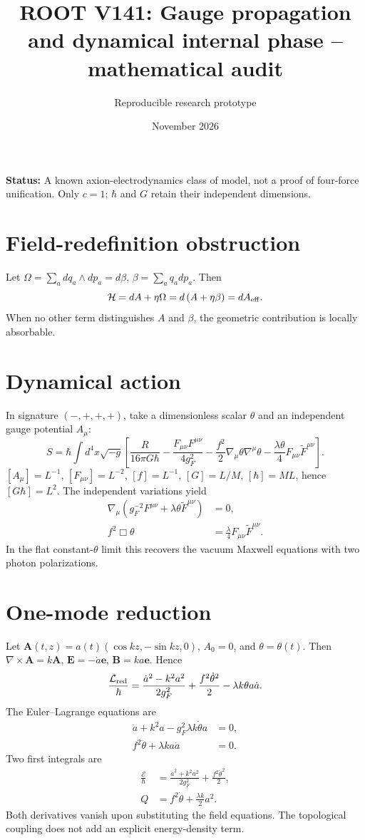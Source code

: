 \documentclass[11pt]{article}
\title{ROOT V141: Gauge propagation and dynamical internal phase -- mathematical audit}
\author{Reproducible research prototype}
\date{November 2026}
\begin{document}
\maketitle
\noindent\textbf{Status:} A known axion-electrodynamics class of model, not a proof of four-force unification. Only $c=1$; $\hbar$ and $G$ retain their independent dimensions.
\section{Field-redefinition obstruction}
Let $\Omega=\sum_a dq_a\wedge dp_a=d\beta$, $\beta=\sum_aq_a dp_a$. Then
\begin{equation}
\mathcal H=dA+\eta\Omega=d\left(A+\eta\beta\right)=dA_{\rm eff}.
\end{equation}
When no other term distinguishes $A$ and $\beta$, the geometric contribution is locally absorbable.
\section{Dynamical action}
In signature $(-,+,+,+)$, take a dimensionless scalar $\theta$ and an independent gauge potential $A_\mu$:
\begin{equation}
S=\hbar\int d^4x\sqrt{-g}\left[\frac{R}{16\pi G\hbar}
-\frac{F_{\mu\nu}F^{\mu\nu}}{4g_F^2}
-\frac{f^2}{2}\nabla_\mu\theta\nabla^\mu\theta
-\frac{\lambda\theta}{4}F_{\mu\nu}\widetilde F^{\mu\nu}\right].
\end{equation}
$[A_\mu]=L^{-1}$, $[F_{\mu\nu}]=L^{-2}$, $[f]=L^{-1}$,
$[G]=L/M$, $[\hbar]=ML$, hence $[G\hbar]=L^2$.
The independent variations yield
\begin{align}
\nabla_\mu\left(g_F^{-2}F^{\mu\nu}+\lambda\theta\widetilde F^{\mu\nu}\right)&=0,\\
f^2\Box\theta&=\frac{\lambda}{4}F_{\mu\nu}\widetilde F^{\mu\nu}.
\end{align}
In the flat constant-$\theta$ limit this recovers the vacuum Maxwell equations with two photon polarizations.
\section{One-mode reduction}
Let $\mathbf A(t,z)=a(t)(\cos kz,-\sin kz,0)$, $A_0=0$, and $\theta=\theta(t)$. Then $\nabla\times\mathbf A=k\mathbf A$, $\mathbf E=-\dot a\mathbf e$, $\mathbf B=ka\mathbf e$. Hence
\begin{equation}
\frac{\mathcal L_{\rm red}}{\hbar}=\frac{\dot a^2-k^2a^2}{2g_F^2}
+\frac{f^2\dot\theta^2}{2}-\lambda k\theta a\dot a.
\end{equation}
The Euler--Lagrange equations are
\begin{align}
\ddot a+k^2 a-g_F^2\lambda k\dot\theta a&=0,\\
f^2\ddot\theta+\lambda k a\dot a&=0.
\end{align}
Two first integrals are
\begin{align}
\frac{\mathcal E}{\hbar}&=\frac{\dot a^2+k^2a^2}{2g_F^2}+\frac{f^2\dot\theta^2}{2},\\
Q&=f^2\dot\theta+\frac{\lambda k}{2}a^2.
\end{align}
Both derivatives vanish upon substituting the field equations. The topological coupling does not add an explicit energy-density term.
\end{document}
